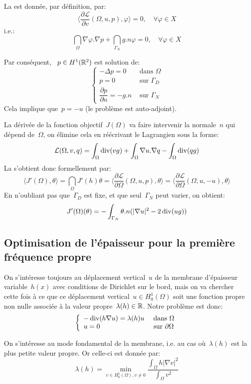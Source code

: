 \medskip
La  est donnée, par définition, par:
\[ \langle \dfrac{\partial \mathcal{L}}{\partial v}(\Omega,u,p),\varphi\rangle=0, \quad \forall\varphi\in X \]
i.e.:
\[ \dint_\Omega \nabla\varphi.\nabla p + \dint_{\Gamma_N} g.n\varphi =0, \quad \forall\varphi\in X \]

Par conséquent, ~$p\in H^1(\mathbb R^2)$ est solution de:
\[\left\{\begin{array}{ll}
-\Delta p =0 &\text{ dans }\Omega\\
p=0 &\text{ sur }\Gamma_D\\
\dfrac{\partial p}{\partial n}=-g.n &\text{ sur }\Gamma_N
\end{array}\right.\]
Cela implique que~$p=-u$ (le problème est auto-adjoint).

\medskip
La dérivée de la fonction objectif~$J(\Omega)$ va faire intervenir la normale~$n$ qui dépend de~$\Omega$, on élimine cela en réécrivant le Lagrangien sous la forme:
\[ \mathcal{L}(\Omega,v,q)=\displaystyle\int_\Omega \operatorname{div}(vg) + \displaystyle\int_\Omega\nabla u.\nabla q-\displaystyle\int_\Omega \operatorname{div}(qg) \]
La  s'obtient donc formellement par:
\[ \langle J'(\Omega),\theta\rangle = \dint_\Omega J'(h)\theta = \langle\dfrac{\partial\mathcal{L}}{\partial \Omega}(\Omega,u,p),\theta\rangle = \langle\dfrac{\partial\mathcal{L}}{\partial \Omega}(\Omega,u,-u),\theta\rangle  \]
En n'oubliant pas que~$\Gamma_D$ est fixe, et que seul~$\Gamma_N$ peut varier, on obtient:
\[ J'(\Omega)(\theta)= -\displaystyle\int_{\Gamma_N} \theta.n(|\nabla u|^2-2\operatorname{div}(ug)) \]


\medskip
\subsection{Optimisation de l'épaisseur pour la première fréquence propre}

On s'intéresse toujours au déplacement vertical~$u$ de la membrane d'épaisseur variable~$h(x)$ avec conditions de Dirichlet sur le bord, mais on va chercher cette fois à ce que ce déplacement vertical~$u\in H^1_0(\Omega)$ soit une fonction propre non nulle associée à la valeur propre~$\lambda(h)\in\mathbb R$. Notre problème est donc:
\[\left\{\begin{array}{ll} -\operatorname{div} (h\nabla u)=\lambda(h)u &\text{ dans }\Omega\\ u=0 &\text{ sur }\partial\Omega \end{array} \right. \]

On s'intéresse au mode fondamental de la membrane, i.e. au cas où~$\lambda(h)$ est la plus petite valeur propre. Or celle-ci est donnée par:
\[ \lambda(h) = \min_{v\in H^1_0(\Omega), v\ne 0} \dfrac{\int_\Omega h|\nabla v|^2}{\int_\Omega v^2} \]

